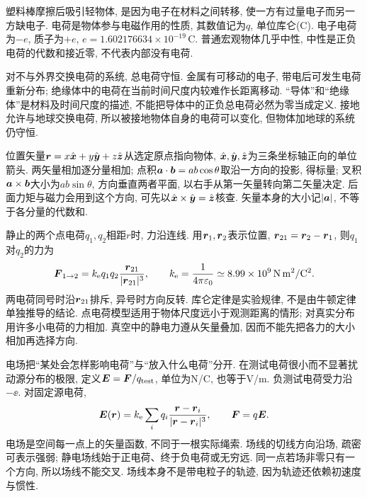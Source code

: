 \label{ch:charge}
塑料棒摩擦后吸引轻物体, 是因为电子在材料之间转移, 使一方有过量电子而另一方缺电子. 电荷是物体参与电磁作用的性质, 其数值记为$q$, 单位库仑(C). 电子电荷为$-e$, 质子为$+e$, $e=1.602176634\times10^{-19}\,\mathrm C$. 普通宏观物体几乎中性, 中性是正负电荷的代数和接近零, 不代表内部没有电荷.

对不与外界交换电荷的系统, 总电荷守恒. 金属有可移动的电子, 带电后可发生电荷重新分布; 绝缘体中的电荷在当前时间尺度内较难作长距离移动. “导体”和“绝缘体”是材料及时间尺度的描述, 不能把导体中的正负总电荷必然为零当成定义. 接地允许与地球交换电荷, 所以被接地物体自身的电荷可以变化, 但物体加地球的系统仍守恒.

位置矢量$\boldsymbol{r}=x\hat{\boldsymbol{x}}+y\hat{\boldsymbol{y}}+z\hat{\boldsymbol{z}}$从选定原点指向物体, $\hat{\boldsymbol{x}},\hat{\boldsymbol{y}},\hat{\boldsymbol{z}}$为三条坐标轴正向的单位箭头. 两矢量相加逐分量相加; 点积$\boldsymbol{a}\cdot\boldsymbol{b}=ab\cos\theta$取沿一方向的投影, 得标量; 叉积$\boldsymbol{a}\times\boldsymbol{b}$大小为$ab\sin\theta$, 方向垂直两者平面, 以右手从第一矢量转向第二矢量决定. 后面力矩与磁力会用到这个方向, 可先以$\hat{\boldsymbol{x}}\times\hat{\boldsymbol{y}}=\hat{\boldsymbol{z}}$核查. 矢量本身的大小记$|\boldsymbol{a}|$, 不等于各分量的代数和.

静止的两个点电荷$q_1,q_2$相距$r$时, 力沿连线. 用$\boldsymbol{r}_1,\boldsymbol{r}_2$表示位置, $\boldsymbol{r}_{21}=\boldsymbol{r}_2-\boldsymbol{r}_1$, 则$q_1$对$q_2$的力为
\[
\boldsymbol{F}_{1\to2}=k_{\mathrm e} q_1q_2\frac{\boldsymbol{r}_{21}}{|\boldsymbol{r}_{21}|^3},\qquad k_{\mathrm e}=\frac1{4\pi\varepsilon_0}\simeq8.99\times10^9\,\mathrm{N\,m^2/C^2}.
\]
两电荷同号时沿$\boldsymbol{r}_{21}$排斥, 异号时方向反转. 库仑定律是实验规律, 不是由牛顿定律单独推导的结论. 点电荷模型适用于物体尺度远小于观测距离的情形; 对真实分布用许多小电荷的力相加. 真空中的静电力遵从矢量叠加, 因而不能先把各力的大小相加再选择方向.

电场把“某处会怎样影响电荷”与“放入什么电荷”分开. 在测试电荷很小而不显著扰动源分布的极限, 定义$\boldsymbol{E}=\boldsymbol{F}/q_{\rm test}$, 单位为N/C, 也等于V/m. 负测试电荷受力沿$-\ee$. 对固定源电荷,
\[
\boldsymbol{E}(\boldsymbol{r})=k_{\mathrm e}\sum_i q_i\frac{\boldsymbol{r}-\boldsymbol{r}_i}{|\boldsymbol{r}-\boldsymbol{r}_i|^3},\qquad \boldsymbol{F}=q\boldsymbol{E}.
\]
电场是空间每一点上的矢量函数, 不同于一根实际绳索. 场线的切线方向沿场, 疏密可表示强弱; 静电场线始于正电荷、终于负电荷或无穷远. 同一点若场非零只有一个方向, 所以场线不能交叉. 场线本身不是带电粒子的轨迹, 因为轨迹还依赖初速度与惯性.

\begin{center}
\end{center}

